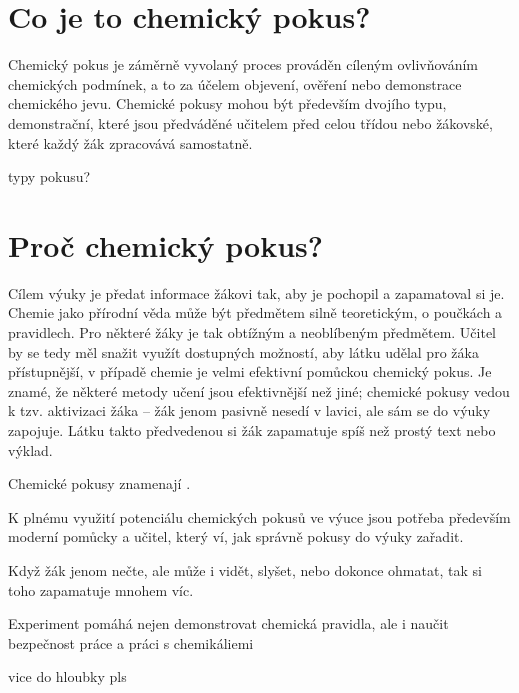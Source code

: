
\section{Co je to chemický pokus?}
Chemický pokus je záměrně vyvolaný proces prováděn cíleným ovlivňováním chemických podmínek, a to za účelem objevení, ověření nebo demonstrace chemického jevu. \cite{badani} Chemické pokusy mohou být především dvojího typu, demonstrační, které jsou předváděné učitelem před celou třídou nebo žákovské, které každý žák zpracovává samostatně.

typy pokusu?

\section{Proč chemický pokus?}
Cílem výuky je předat informace žákovi tak, aby je pochopil a zapamatoval si je. Chemie jako přírodní věda může být předmětem silně teoretickým, o poučkách a pravidlech. Pro některé žáky je tak obtížným a neoblíbeným předmětem.\cite{oblibenost} Učitel by se tedy měl snažit využít dostupných možností, aby látku udělal pro žáka přístupnější, v případě chemie je velmi efektivní pomůckou chemický pokus. Je znamé, že některé metody učení jsou efektivnější než jiné; chemické pokusy vedou k tzv. aktivizaci žáka -- žák jenom pasivně nesedí v lavici, ale sám se do výuky zapojuje. Látku takto předvedenou si žák zapamatuje spíš než prostý text nebo výklad.\cite{badani}

Chemické pokusy znamenají .

K plnému využití potenciálu chemických pokusů ve výuce jsou potřeba především moderní pomůcky a učitel, který ví, jak správně pokusy do výuky zařadit.  

Když žák jenom nečte, ale může i vidět, slyšet, nebo dokonce ohmatat, tak si toho zapamatuje mnohem víc.

Experiment pomáhá nejen demonstrovat chemická pravidla, ale i naučit bezpečnost práce a práci s chemikáliemi

vice do hloubky pls
